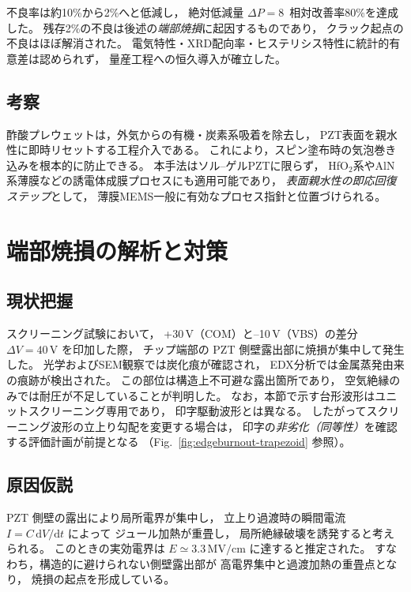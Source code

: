 \documentclass[conference]{IEEEtran}
\begin{document}
不良率は約10\%から2\%へと低減し，
絶対低減量 $\Delta P=8$\,%
相対改善率80\%を達成した。
残存2\%の不良は後述の\emph{端部焼損}に起因するものであり，
クラック起点の不良はほぼ解消された。
電気特性・XRD配向率・ヒステリシス特性に統計的有意差は認められず，
量産工程への恒久導入が確立した。

\subsection{考察}
酢酸プレウェットは，外気からの有機・炭素系吸着を除去し，
PZT表面を親水性に即時リセットする工程介入である。
これにより，スピン塗布時の気泡巻き込みを根本的に防止できる。
本手法はソル–ゲルPZTに限らず，
HfO$_2$系やAlN系薄膜などの誘電体成膜プロセスにも適用可能であり，
\emph{表面親水性の即応回復ステップ}として，
薄膜MEMS一般に有効なプロセス指針と位置づけられる。

\section{端部焼損の解析と対策}
\label{sec:burnout}

\subsection{現状把握}
スクリーニング試験において，
+30\,V（COM）と--10\,V（VBS）の差分
$\Delta V = 40\,\mathrm{V}$ を印加した際，
チップ端部の PZT 側壁露出部に焼損が集中して発生した。
光学およびSEM観察では炭化痕が確認され，
EDX分析では金属蒸発由来の痕跡が検出された。
この部位は構造上不可避な露出箇所であり，
空気絶縁のみでは耐圧が不足していることが判明した。
なお，本節で示す台形波形はユニットスクリーニング専用であり，
印字駆動波形とは異なる。
したがってスクリーニング波形の立上り勾配を変更する場合は，
印字の\emph{非劣化（同等性）}を確認する評価計画が前提となる
（Fig.~\ref{fig:edgeburnout-trapezoid} 参照）。

\subsection{原因仮説}
PZT 側壁の露出により局所電界が集中し，
立上り過渡時の瞬間電流 $I = C\,\mathrm{d}V/\mathrm{d}t$ によって
ジュール加熱が重畳し，
局所絶縁破壊を誘発すると考えられる。
このときの実効電界は
$E \simeq 3.3\,\mathrm{MV/cm}$ に達すると推定された。
すなわち，構造的に避けられない側壁露出部が
高電界集中と過渡加熱の重畳点となり，
焼損の起点を形成している。
\end{document}

